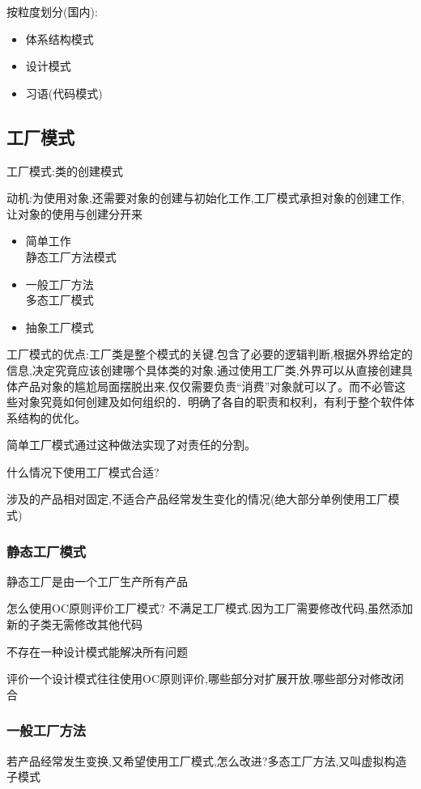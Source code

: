 \documentclass[UTF8,a4paper]{ctexart}
\begin{document}
按粒度划分(国内):
\begin{itemize}
  \item 体系结构模式
  \item 设计模式
  \item 习语(代码模式)
\end{itemize}

\subsection{工厂模式}
工厂模式:类的创建模式

动机:为使用对象,还需要对象的创建与初始化工作,工厂模式承担对象的创建工作,让对象的使用与创建分开来

\begin{itemize}
  \item 简单工作\\
  静态工厂方法模式
  \item 一般工厂方法\\
  多态工厂模式
  \item 抽象工厂模式
\end{itemize}

工厂模式的优点:工厂类是整个模式的关键.包含了必要的逻辑判断,根据外界给定的信息,决定究竟应该创建哪个具体类的对象.通过使用工厂类,外界可以从直接创建具体产品对象的尴尬局面摆脱出来,仅仅需要负责“消费”对象就可以了。而不必管这些对象究竟如何创建及如何组织的．明确了各自的职责和权利，有利于整个软件体系结构的优化。

简单工厂模式通过这种做法实现了对责任的分割。

什么情况下使用工厂模式合适?

涉及的产品相对固定,不适合产品经常发生变化的情况(绝大部分单例使用工厂模式)

\subsubsection{静态工厂模式}
静态工厂是由一个工厂生产所有产品

怎么使用OC原则评价工厂模式?
不满足工厂模式,因为工厂需要修改代码,虽然添加新的子类无需修改其他代码

不存在一种设计模式能解决所有问题

评价一个设计模式往往使用OC原则评价,哪些部分对扩展开放,哪些部分对修改闭合

\subsubsection{一般工厂方法}
若产品经常发生变换,又希望使用工厂模式,怎么改进?多态工厂方法,又叫虚拟构造子模式
\end{document}
